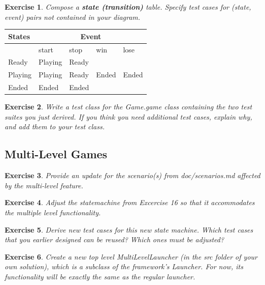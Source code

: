 \documentclass[a4paper]{article}
\newtheorem{thm}{Exercise}
\begin{document}
    \newpage
    \begin{thm}
      Compose a \textbf{state (transition)} table.
      Specify test cases for (state, event) pairs not contained in your diagram.
    \end{thm}
    \begin{table}[h]
      \begin{tabular}{|l|l|l|l|l|}
        \hline
        States  & \multicolumn{4}{|c|}{Event}       \\ \hline
                & start   & stop    & win    & lose  \\ \hline
        Ready   & Playing & Ready   &        &       \\ \hline
        Playing & Playing & Ready   & Ended  & Ended \\ \hline
        Ended   & Ended   & Ended   &        &       \\ \hline
      \end{tabular}
    \end{table}
    
    \begin{thm}
      Write a test class for the \textit{Game.game} class containing the two test suites you just derived.
      If you think you need additional test cases, explain why, and add them to your test class.
    \end{thm}
  
  \subsection{Multi-Level Games}
    \begin{thm}
      Provide an update for the scenario(s) from \textit{doc/scenarios.md} affected by the multi-level feature.
    \end{thm}

    \begin{thm}
      Adjust the statemachine from Excercise 16 so that it accommodates the multiple level functionality.
    \end{thm}

    \begin{thm}
      Derive new test cases for this new state machine.
      Which test cases that you earlier designed can be reused? Which ones must be adjusted?
    \end{thm}
    
    \begin{thm}
      Create a new top level MultiLevelLauncher (in the \textit{src} folder of your own solution),
      which is a subclass of the framework’s Launcher.
      For now, its functionality will be exactly the same as the regular launcher.
    \end{thm}
    
\end{document}
